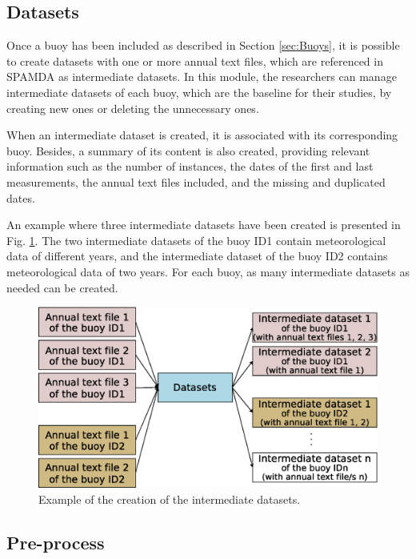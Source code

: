 \documentclass[review]{elsarticle}
\begin{document}
			\subsection{Datasets}\label{sec:Datasets}
			
				Once a buoy has been included as described in Section \ref{sec:Buoys}, it is possible to create datasets with one or more annual text files, which are referenced in SPAMDA as intermediate datasets. In this module, the researchers can manage intermediate datasets of each buoy, which are the baseline for their studies, by creating new ones or deleting the unnecessary ones.
				
				When an intermediate dataset is created, it is associated with its corresponding buoy. Besides, a summary of its content is also created, providing relevant information such as the number of instances, the dates of the first and last measurements, the annual text files included, and the missing and duplicated dates.
				
				An example where three intermediate datasets have been created is presented in Fig. \ref{fig:datasets}. The two intermediate datasets of the buoy ID1 contain meteorological data of different years, and the intermediate dataset of the buoy ID2 contains meteorological data of two years. For each buoy, as many intermediate datasets as needed can be created.
				
				\begin{figure}[ht!]
					\centering
					\includegraphics[scale=0.40]{figures/FigureDatasets.eps}
					\caption{Example of the creation of the intermediate datasets.}
					\label{fig:datasets}
				\end{figure}
				
				
			\subsection{Pre-process} \label{sec:Preprocess}
				
\end{document}
